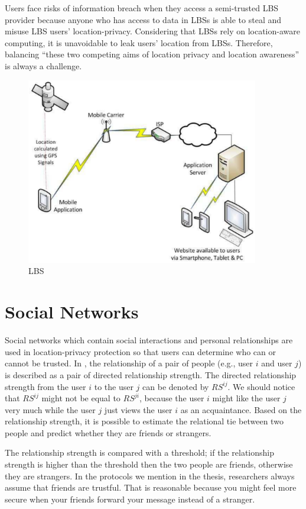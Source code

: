 Users face risks of information breach when they access a semi-trusted LBS provider because anyone who has access to data in LBSs is able to steal and misuse LBS users' location-privacy. Considering that LBSs rely on location-aware computing, it is unavoidable to leak users' location from LBSs. Therefore, balancing ``these two competing aims of location privacy and location awareness'' \cite {C20} is always a challenge.

\begin{figure} [H]
  \centering 
  \includegraphics[width=4.0in]{figures/FIG_LBS_11.png}
  \caption{LBS \cite {C11}} 
  \label{fig:LBS} %
\end{figure}

\section{Social Networks}

\noindent Social networks which contain social interactions and personal relationships are used in location-privacy protection so that users can determine who can or cannot be trusted. In \cite {C30}, the relationship of a pair of people (e.g., user $i$ and user $j$) is described as a pair of directed relationship strength. The directed relationship strength from the user $i$ to the user $j$ can be denoted by ${RS}^{ij}$. We should notice that ${RS}^{ij}$ might not be equal to ${RS}^{ji}$, because the user $i$ might like the user $j$ very much while the user $j$ just views the user $i$ as an acquaintance. Based on the relationship strength, it is possible to estimate the relational tie between two people and predict whether they are friends or strangers. 

The relationship strength is compared with a threshold; if the relationship strength is higher than the threshold then the two people are friends, otherwise they are strangers. In the protocols we mention in the thesis, researchers always assume that friends are trustful. That is reasonable because you might feel more secure when your friends forward your message instead of a stranger. 


